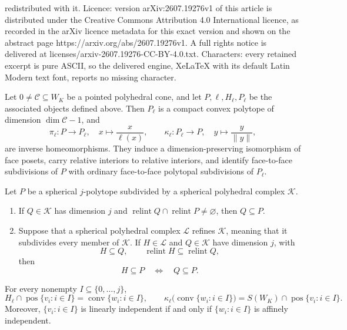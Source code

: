 \documentclass[10pt,a4paper]{amsart}
\DeclareMathOperator{\conv}{conv}
\DeclareMathOperator{\pos}{pos}
\DeclareMathOperator{\relint}{relint}
\begin{document}
redistributed with it. Licence: version arXiv:2607.19276v1 of this article is distributed under the Creative Commons Attribution 4.0 International licence, as recorded in the arXiv licence metadata for this exact version and shown on the abstract page https://arxiv.org/abs/2607.19276v1. A full rights notice is delivered at licenses/arxiv-2607.19276-CC-BY-4.0.txt. Characters: every retained excerpt is pure ASCII, so the delivered engine, XeLaTeX with its default Latin Modern text font, reports no missing character.
\begin{lemma}
\label{lem:spherical-affine-model}
Let \(0\ne\mathcal C\subseteq W_K\) be a pointed polyhedral cone,
and let \(P,\ell,H_\ell,P_\ell\) be the associated objects defined
above.
Then \(P_\ell\) is a compact convex polytope of dimension
\(\dim\mathcal C-1\), and
\[
 \pi_\ell:P\longrightarrow P_\ell,
 \quad x\longmapsto\frac{x}{\ell(x)},
 \qquad
 \kappa_\ell:P_\ell\longrightarrow P,
 \quad y\longmapsto\frac{y}{\|y\|},
\]
are inverse homeomorphisms.  They induce a dimension-preserving
isomorphism of face posets, carry relative interiors to relative
interiors, and identify
face-to-face subdivisions of \(P\) with ordinary face-to-face
polytopal subdivisions of \(P_\ell\).
\end{lemma}

\begin{lemma}
\label{lem:refinement-membership}
Let \(P\) be a spherical \(j\)-polytope subdivided by a spherical
polyhedral complex \(\mathcal K\).

\begin{enumerate}[label=\textup{(\roman*)},leftmargin=*]
\item If \(Q\in\mathcal K\) has dimension \(j\) and
\(\relint Q\cap\relint P\ne\varnothing\), then \(Q\subseteq P\).

\item Suppose that a spherical polyhedral complex \(\mathcal L\)
refines \(\mathcal K\), meaning that it subdivides every member of
\(\mathcal K\).  If \(H\in\mathcal L\) and
\(Q\in\mathcal K\) have dimension \(j\), with
\[
 H\subseteq Q,
 \qquad
 \relint H\subseteq\relint Q,
\]
then
\[
 H\subseteq P\quad\Longleftrightarrow\quad Q\subseteq P.
\]
\end{enumerate}
\end{lemma}

\begin{lemma}
\label{lem:positive-cone-section}
For every nonempty \(I\subseteq\{0,\ldots,j\}\),
\[
 H_\ell\cap\pos\{v_i:i\in I\}=\conv\{w_i:i\in I\},
 \qquad
 \kappa_\ell\bigl(\conv\{w_i:i\in I\}\bigr)
 =S(W_K)\cap\pos\{v_i:i\in I\}.
\]
Moreover, \(\{v_i:i\in I\}\) is linearly independent if and only if
\(\{w_i:i\in I\}\) is affinely independent.
\end{lemma}
\end{document}
